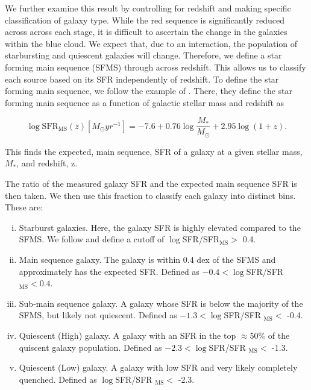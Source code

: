 \documentclass[fleqn,usenatbib]{mnras}
\begin{document}
We further examine this result by controlling for redshift and making specific classification of galaxy type. While the red sequence is significantly reduced across across each stage, it is difficult to ascertain the change in the galaxies within the blue cloud. We expect that, due to an interaction, the population of starbursting and quiescent galaxies will change. Therefore, we define a star forming main sequence (SFMS) through across redshift. This allows us to classify each source based on its SFR independently of redshift. To define the star forming main sequence, we follow the example of \citet{2019MNRAS.484.4360A}. There, they define the star forming main sequence as a function of galactic stellar mass and redshift as

\begin{equation}
    \log \text{SFR}_{\text{MS}}(z)[M_\odot yr^{-1}] = -7.6 + 0.76\log\frac{M_*}{M_\odot} + 2.95\log(1+z).
\end{equation}

\noindent This finds the expected, main sequence, SFR of a galaxy at a given stellar mass, $M_*$, and redshift, z.

The ratio of the measured galaxy SFR and the expected main sequence SFR is then taken. We then use this fraction to classify each galaxy into distinct bins. These are:

\begin{enumerate}[(i)]
    \item Starburst galaxies. Here, the galaxy SFR is highly elevated compared to the SFMS. We follow \citet{2019MNRAS.484.4360A} and define a cutoff of $\log$SFR/SFR$_{\text{MS}} >$ 0.4.
    \item Main sequence galaxy. The galaxy is within 0.4 dex of the SFMS and approximately has the expected SFR. Defined as $-0.4 < \log$SFR/SFR$_{\text{MS}} < 0.4$.
    \item Sub-main sequence galaxy. A galaxy whose SFR is below the majority of the SFMS, but likely not quiescent. Defined as $-1.3 < \log$SFR/SFR $_{\text{MS}} < $ -0.4.
    \item Quiescent (High) galaxy. A galaxy with an SFR in the top $\approx$50\% of the quiscent galaxy population. Defined as $-2.3 < \log$SFR/SFR $_{\text{MS}} <$ -1.3.
    \item Quiescent (Low) galaxy. A galaxy with low SFR and very likely completely quenched. Defined as $\log$SFR/SFR $_{\text{MS}} <$ -2.3.
\end{enumerate}
\end{document}
